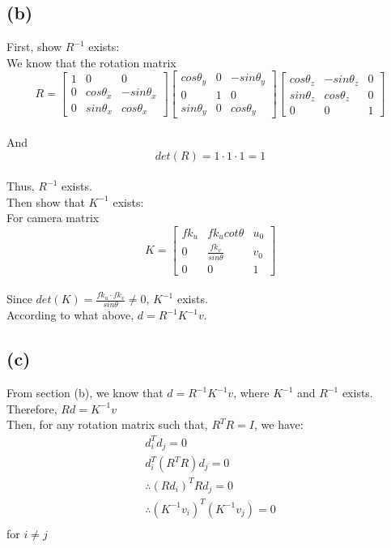 \documentclass[letterpaper]{article}
\begin{document}
\subsection*{(b)}
First, show $R^{-1}$ exists:\\
We know that the rotation matrix
$$
R=\begin{bmatrix}
1 & 0 & 0 \\
0 & cos\theta_x & -sin\theta_x \\
0 & sin\theta_x  & cos\theta_x
\end{bmatrix}
\begin{bmatrix}
cos\theta_y & 0 & -sin\theta_y\\
0 & 1 & 0\\
sin\theta_y & 0 & cos\theta_y
\end{bmatrix}
\begin{bmatrix}
cos\theta_z & -sin\theta_z & 0\\
sin\theta_z & cos\theta_z & 0\\
0 & 0 & 1
\end{bmatrix}
$$\\
And $$det(R)=1\cdot1\cdot1=1$$\\
Thus, $R^{-1}$ exists.\\

Then show that $K^{-1}$ exists:\\
For camera matrix $$K=\begin{bmatrix}
fk_u & fk_ucot\theta & u_0\\
0 & \frac{fk_v}{sin\theta} & v_0\\
0 & 0 & 1
\end{bmatrix}$$\\
Since $det(K)=\frac{fk_u\cdot fk_v}{sin\theta}\neq 0$, $K^{-1}$ exists.\\
According to what above, $d=R^{-1} K^{-1}v$.\\
\subsection*{(c)}
From section (b), we know that $d=R^{-1} K^{-1}v$, where $K^{-1}$ and $R^{-1}$ exists.\\
Therefore, $Rd=K^{-1}v$\\
Then, for any rotation matrix such that, $R^TR = I$, we have:\\
\begin{align*}
d_{i}^{T}d_j=0\\
d_{i}^{T}(R^TR)d_j=0\\
\therefore (Rd_i)^TRd_j=0\\
\therefore (K^{-1}v_i)^T(K^{-1}v_j)=0\\
\end{align*}
for $i\neq j$\\
\clearpage
\end{document}
